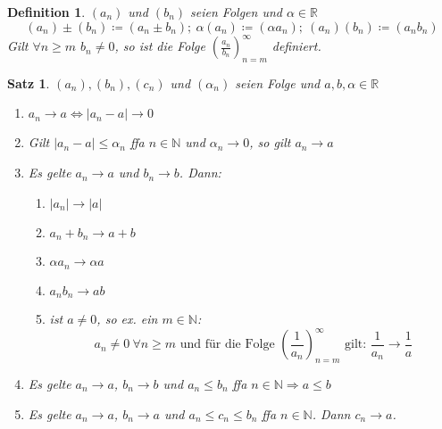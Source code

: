 \documentclass[14pt,titlepage,ngerman,a4paper,headsepline,DIV15,halfparskip*]{scrartcl}
\newcommand{\N}{\mathbb{N}}
\newcommand{\R}{\mathbb{R}}
\theoremstyle{named}
\theoremstyle{dotless}
\newtheorem{satz}[namedtheorem]{Satz}
\newtheorem*{definition}{Definition}
\begin{document}
\begin{definition}
	$(a_{n})$ und $(b_{n})$ seien Folgen und $\alpha \in \R$
	$$
		(a_{n}) \pm (b_{n}) \coloneqq (a_{n} \pm b_{n}); ~
		\alpha (a_{n}) \coloneqq (\alpha a_{n}); ~
		(a_{n}) (b_{n}) \coloneqq (a_{n} b_{n}) 		
	$$	
	Gilt $\forall n \geq m$ $b_{n} \neq 0$, so ist die Folge $\left( \frac{a_{n}}{b_{n}} \right)_{n = m}^{\infty}$ definiert.
\end{definition}


\begin{satz} \label{2.2:satz}
	$(a_{n}), (b_{n}), (c_{n})$ und $(\alpha_{n})$ seien Folge und $a, b, \alpha \in \R$

	\begin{enumerate}
		\item $a_{n} \rightarrow a \iff |a_{n} - a| \rightarrow 0$
		\item Gilt $|a_{n} - a| \leq \alpha_{n}$ ffa $n \in \N$ und $\alpha_{n} \rightarrow 0$, so gilt $a_{n} \rightarrow a$
		\item Es gelte $a_{n} \rightarrow a$ und $b_{n} \rightarrow b$. Dann:
			\begin{enumerate}
				\item $|a_{n}| \rightarrow |a|$ 
				\item $a_{n} + b_{n} \rightarrow a + b$
				\item $\alpha a_{n} \rightarrow \alpha a$
				\item $a_{n} b_{n} \rightarrow a b$
				\item ist $a \neq 0$, so ex. ein $m \in \N$:
					$$
						a_{n} \neq 0 ~\forall n \geq m \text{ und für die Folge } \left( \frac{1}{a_{n}} \right)_{n = m}^{\infty} \text{ gilt: } \frac{1}{a_{n}} \rightarrow \frac{1}{a}
					$$
			\end{enumerate}
		\item Es gelte $a_{n} \rightarrow a$, $b_{n} \rightarrow b$ und $a_{n} \leq b_{n}$ ffa $n \in \N \Rightarrow a \leq b$
		\item Es gelte $a_{n} \rightarrow a$, $b_{n} \rightarrow a$ und $a_{n} \leq c_{n} \leq b_{n}$ ffa $n \in \N$. Dann $c_{n} \rightarrow a$. \label{2.2.e:satz}
	\end{enumerate}
\end{satz}
\end{document}
